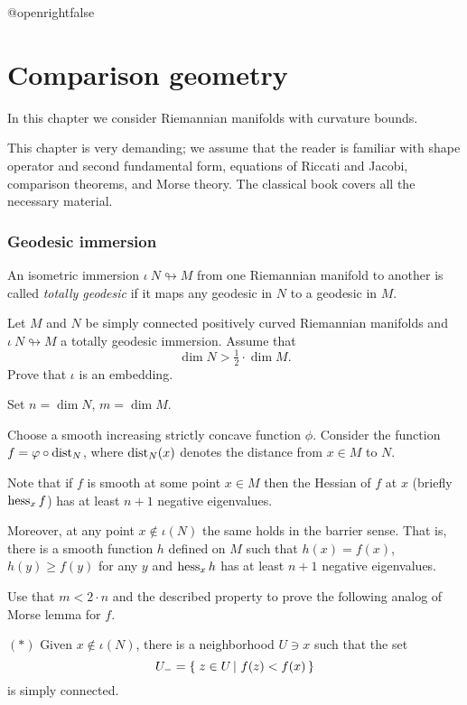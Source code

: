 \csname @openrightfalse\endcsname
\chapter{Comparison geometry}

In this chapter we consider Riemannian manifolds with curvature bounds.

This chapter is very demanding;
we assume that the reader is familiar with   
shape operator and second fundamental form, 
equations of Riccati and Jacobi,
comparison theorems,
and Morse theory.
The classical book \cite{cheeger-ebin} covers all the  necessary  material.

\subsection*{Geodesic immersion\hard}
\label{Geodesic immersion}

An isometric immersion $\iota\:N\looparrowright M$ from one Riemannian manifold to another is called \emph{totally geodesic} if it maps any geodesic in $N$ to a geodesic in $M$.

\begin{pr}
Let $M$ and $N$ be simply connected positively curved Riemannian manifolds and $\iota\:N\looparrowright M$ a totally geodesic immersion.
Assume that 
\[\dim N>\tfrac 12\cdot \dim M.\]
Prove that $\iota$ is an embedding.
\end{pr}

Set $n=\dim N$, $m=\dim M$.

Choose a smooth increasing strictly concave function $\phi$.
Consider the function $f=\varphi\circ\operatorname{\rm dist}\nolimits_N$,
where $\operatorname{\rm dist}\nolimits_N(x)$ denotes the distance from $x\in M$ to $N$.

Note that if $f$ is smooth at some point $x\in M$ 
then the Hessian of $f$ at $x$ (briefly $\operatorname{\rm hess}\nolimits_xf$)
has at least $n+1$ negative eigenvalues.

Moreover, at any point $x\notin \iota(N)$ the same holds in the barrier sense\label{page:barrier sense}.
That is, there is a smooth function $h$ defined on $M$
such that $h(x)=f(x)$, $h(y)\ge f(y)$ for any $y$
and $\operatorname{\rm hess}\nolimits_xh$ has at least $n+1$ negative eigenvalues.

Use that $m< 2\cdot n$ and the described property to prove the following
analog of Morse lemma for $f$.

\begin{cl}{$({*})$}
 Given $x\notin \iota(N)$, there is a neighborhood $U\ni x$ such that the set 
\[U_-=\set{z\in U}{f(z)<f(x)}\] is simply connected.
\end{cl}

